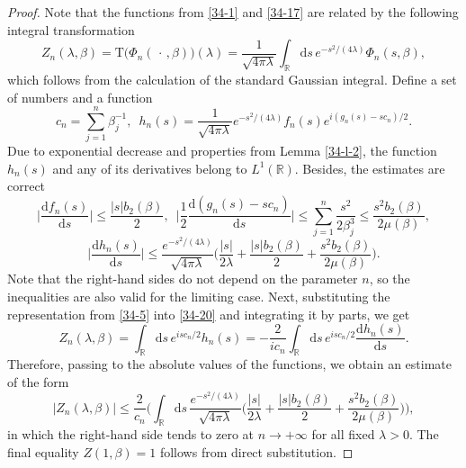 \documentclass[10pt,a4paper]{amsart}
\begin{document}
\begin{proof} Note that the functions from \eqref{34-1} and \eqref{34-17} are related by the following integral transformation
\begin{equation}\label{34-20}
	Z_n(\lambda,\beta)=\mathrm{T}\big(\Phi_n(\,\cdot\,,\beta)\big)(\lambda)=
	\frac{1}{\sqrt{4\pi\lambda}}
	\int_{\mathbb{R}}\mathrm{d}s\,e^{-s^2/(4\lambda)}
	\Phi_n(s,\beta),
\end{equation}
which follows from the calculation of the standard Gaussian integral. Define a set of numbers and a function
\begin{equation}\label{34-23}
c_n=\sum_{j=1}^n\beta_j^{-1},\,\,\,h_n(s)=\frac{1}{\sqrt{4\pi\lambda}}e^{-s^2/(4\lambda)}
f_n(s)e^{i(g_n(s)-sc_n)/2}.
\end{equation}
Due to exponential decrease and properties from Lemma \ref{34-l-2}, the function $h_n(s)$ and any of its derivatives belong to $L^1(\mathbb{R})$. Besides, the estimates are correct
\begin{equation}\label{34-25}
\bigg|\frac{\mathrm{d}f_n(s)}{\mathrm{d}s}\bigg|\leqslant\frac{|s|b_2(\beta)}{2},\,\,\,
\bigg|\frac{1}{2}\frac{\mathrm{d}(g_n(s)-sc_n)}{\mathrm{d}s}\bigg|\leqslant
\sum_{j=1}^n\frac{s^2}{2\beta_j^3}\leqslant\frac{s^2b_2(\beta)}{2\mu(\beta)},
\end{equation}
\begin{equation}\label{34-24}
\bigg|\frac{\mathrm{d}h_n(s)}{\mathrm{d}s}\bigg|\leqslant
\frac{e^{-s^2/(4\lambda)}}{\sqrt{4\pi\lambda}}
\bigg(\frac{|s|}{2\lambda}+\frac{|s|b_2(\beta)}{2}+\frac{s^2b_2(\beta)}{2\mu(\beta)}\bigg).
\end{equation}
Note that the right-hand sides do not depend on the parameter $n$, so the inequalities are also valid for the limiting case.
Next, substituting the representation from \eqref{34-5} into \eqref{34-20} and integrating it by parts, we get
\begin{equation}\label{34-26}
Z_n(\lambda,\beta)=\int_{\mathbb{R}}\mathrm{d}s\,e^{isc_n/2}h_n(s)=-
\frac{2}{ic_n}\int_{\mathbb{R}}\mathrm{d}s\,e^{isc_n/2}\frac{\mathrm{d}h_n(s)}{\mathrm{d}s}.
\end{equation}
Therefore, passing to the absolute values of the functions, we obtain an estimate of the form
\begin{equation}\label{34-18}
|Z_n(\lambda,\beta)|\leqslant
\frac{2}{c_n}
\Bigg(
\int_{\mathbb{R}}\mathrm{d}s\,\frac{e^{-s^2/(4\lambda)}}{\sqrt{4\pi\lambda}}
\bigg(\frac{|s|}{2\lambda}+\frac{|s|b_2(\beta)}{2}+\frac{s^2b_2(\beta)}{2\mu(\beta)}\bigg)\Bigg),
\end{equation}
in which the right-hand side tends to zero at $n\to+\infty$ for all fixed $\lambda>0$. The final equality $Z(1,\beta)=1$ follows from direct substitution.
\end{proof}
\end{document}
